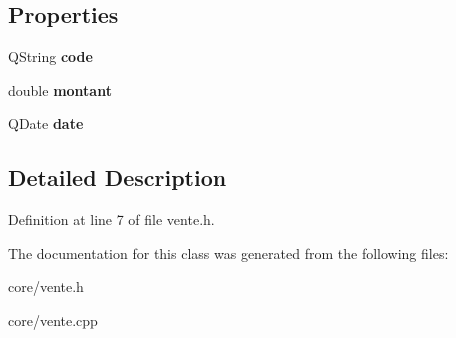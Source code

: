 \subsection*{Properties}
\begin{DoxyCompactItemize}
\item 
\hypertarget{class_vente_a6896578d31d7e92927ce3130b4433299}{
QString {\bfseries code}}
\label{class_vente_a6896578d31d7e92927ce3130b4433299}

\item 
\hypertarget{class_vente_a734b3af9d073cc63e119ac3b34cc97f8}{
double {\bfseries montant}}
\label{class_vente_a734b3af9d073cc63e119ac3b34cc97f8}

\item 
\hypertarget{class_vente_a6878cc347d579a77bcacec58d12cb73c}{
QDate {\bfseries date}}
\label{class_vente_a6878cc347d579a77bcacec58d12cb73c}

\end{DoxyCompactItemize}


\subsection{Detailed Description}


Definition at line 7 of file vente.h.



The documentation for this class was generated from the following files:\begin{DoxyCompactItemize}
\item 
core/vente.h\item 
core/vente.cpp\end{DoxyCompactItemize}
